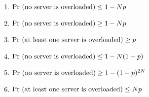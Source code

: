 \documentclass[11pt, preview]{standalone} %
\begin{document}
\begin{enumerate}
   \begin{Multi}
\begin{enumerate}
    \FalseChoice\item $\textnormal{Pr (no server is overloaded)} \leq 1-Np$
    \TrueChoice\item $\textnormal{Pr (no server is overloaded)} \geq 1-Np$
    \TrueChoice\item $\textnormal{Pr (at least one server is overloaded)} \geq p$
    \FalseChoice\item $\textnormal{Pr (no server is overloaded)} \leq 1-N(1-p)$
    \FalseChoice\item $\textnormal{Pr (no server is overloaded)} \geq 1-(1-p)^{2N}$
    \TrueChoice\item $\textnormal{Pr (at least one server is overloaded)} \leq Np$
\end{enumerate}
\end{Multi}

\end{enumerate}
\end{document}
